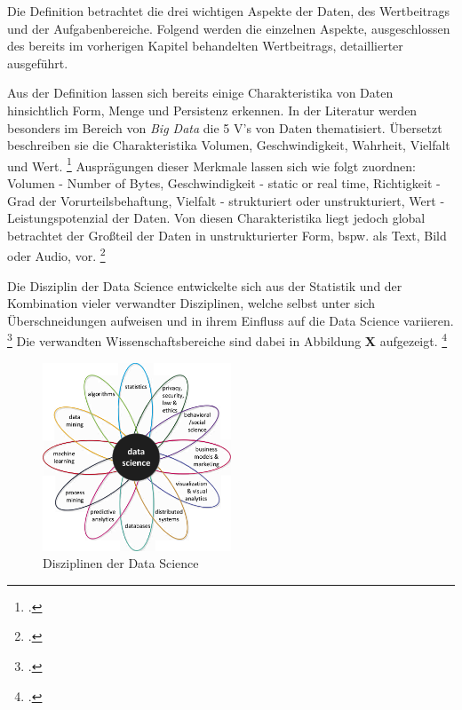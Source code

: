 Die Definition betrachtet die drei wichtigen Aspekte der Daten, des Wertbeitrags und der Aufgabenbereiche.
Folgend werden die einzelnen Aspekte, ausgeschlossen des bereits im vorherigen Kapitel behandelten Wertbeitrags, detaillierter ausgeführt.

Aus der Definition lassen sich bereits einige Charakteristika von Daten hinsichtlich Form, Menge und Persistenz erkennen.
In der Literatur werden besonders im Bereich von \textit{Big Data} die 5 V's von Daten thematisiert.
Übersetzt beschreiben sie die Charakteristika Volumen, Geschwindigkeit, Wahrheit, Vielfalt und Wert. \footcite[prenote][postnote]{Big data is always}
Ausprägungen dieser Merkmale lassen sich wie folgt zuordnen: Volumen - Number of Bytes, Geschwindigkeit - static or real time, Richtigkeit - Grad der Vorurteilsbehaftung, Vielfalt - strukturiert oder unstrukturiert, Wert - Leistungspotenzial der Daten.
Von diesen Charakteristika liegt jedoch global betrachtet der Großteil der Daten in unstrukturierter Form, bspw. als Text, Bild oder Audio, vor. \footcite[prenote][postnote]{most of the data}

Die Disziplin der Data Science entwickelte sich aus der Statistik und der Kombination vieler verwandter Disziplinen, welche selbst unter sich Überschneidungen aufweisen und in ihrem Einfluss auf die Data Science variieren. \footcite[prenote][postnote]{disciplines of data science}
Die verwandten Wissenschaftsbereiche sind dabei in Abbildung \textbf{X} aufgezeigt. \footcite[prenote][postnote]{disciplines of data science}

\begin{figure}[htb]
    \centering
    \includegraphics[width=0.5\textwidth]{graphics/ds_disciplines.png}
    \caption{Disziplinen der Data Science}
    \label{fig:data science disciplines}
\end{figure}

